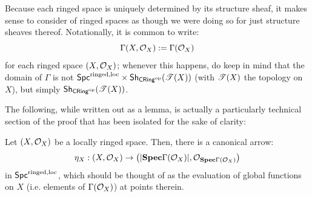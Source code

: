                 \begin{remark}
                    Because each ringed space is uniquely determined by its structure sheaf, it makes sense to consider  of ringed spaces as though we were doing so for just structure sheaves thereof. Notationally, it is common to write:
                        $$\Gamma(X, \mathcal{O}_X) := \Gamma(\mathcal{O}_X)$$
                    for each ringed space $(X, \mathcal{O}_X)$; whenever this happens, do keep in mind that the domain of $\Gamma$ is not $\Spc^{\ringed, \loc} \x \Sh_{\Cring^{\op}}(\T(X))$ (with $\mathscr{T}(X)$ the topology on $X$), but simply $\mathsf{Sh}_{\mathsf{CRing}^{\mathrm{op}}}(\mathscr{T}(X))$.   
                \end{remark}
                    
                The following, while written out as a lemma, is actually a particularly technical section of the proof that has been isolated for the sake of clarity:
                \begin{lemma}\label{lemma: adjunction_unit_ringed_spaces}
                    Let $(X, \mathcal{O}_X)$ be a locally ringed space. Then, there is a canonical arrow:
                        $$\eta_X: (X, \mathcal{O}_X) \to \left(|\mathbf{Spec} \Gamma(\mathcal{O}_X)|, \mathcal{O}_{\mathbf{Spec} \Gamma(\mathcal{O}_X)}\right)$$
                    in $\mathsf{Spc}^{\mathrm{ringed}, \mathrm{loc}}$, which should be thought of as the evaluation of global functions on $X$ (i.e. elements of $\Gamma(\mathcal{O}_X)$) at points therein.
                \end{lemma}
